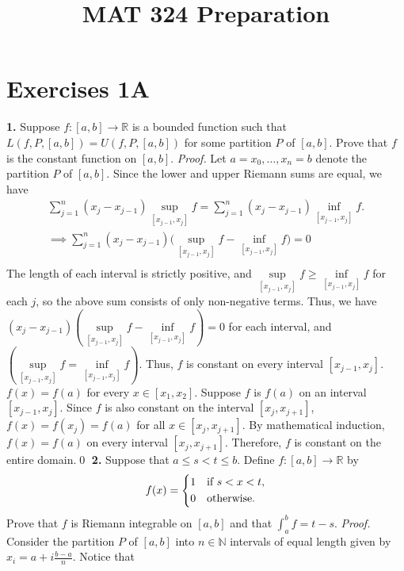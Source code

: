 \documentclass{article}
\title{MAT 324 Preparation}
\date{}
\begin{document}
\section*{Exercises 1A}
\textbf{1. } Suppose $f:[a,b]\rightarrow \mathbb{R}$ is a bounded function such that $L(f,P,[a,b])=U(f,P,[a,b])$ for some partition $P$ of $[a,b]$. Prove that $f$ is the constant function on $[a,b]$.
\newline
\textit{Proof.} Let $a=x_0,\ldots,x_n=b$ denote the partition $P$ of $[a,b]$. Since the lower and upper Riemann sums are equal, we have
\begin{align*}
    \sum_{j=1}^n(x_j-x_{j-1})\underset{[x_{j-1},x_j]}{\sup}f=\sum_{j=1}^n(x_j-x_{j-1})\underset{[x_{j-1},x_j]}{\inf}f.\\
    \implies
    \sum_{j=1}^n(x_j-x_{j-1})\Big(\underset{[x_{j-1},x_j]}{\sup}f-\underset{[x_{j-1},x_j]}{\inf}f\Big)=0\\
\end{align*}
The length of each interval is strictly positive, and $\underset{[x_{j-1},x_j]}{\sup}f\geq \underset{[x_{j-1},x_j]}{\inf}f$ for each $j$, so the above sum consists of only non-negative terms. Thus, we have $(x_j-x_{j-1})(\underset{[x_{j-1},x_j]}{\sup}f-\underset{[x_{j-1},x_j]}{\inf}f)=0$ for each interval, and $(\underset{[x_{j-1},x_j]}{\sup}f=\underset{[x_{j-1},x_j]}{\inf}f)$. Thus, $f$ is constant on every interval $[x_{j-1},x_j]$.
\\
\newline
\newline
$f(x)=f(a)$ for every $x\in[x_1,x_2]$. Suppose $f$ is $f(a)$ on an interval $[x_{j-1},x_j]$. Since $f$ is also constant on the interval $[x_j,x_{j+1}]$, $f(x)=f(x_j)=f(a)$ for all $x\in [x_j,x_{j+1}]$. By mathematical induction, $f(x)=f(a)$ on every interval $[x_j,x_{j+1}]$. Therefore, $f$ is constant on the entire domain.\qed
\newline
\newline
\textbf{2. } Suppose that $a\leq s < t \leq b$. Define $f:[a,b]\rightarrow \mathbb{R}$ by 
\begin{equation*}
    f(x)=
    \begin{cases*}
        1 &\text{if }$s<x<t$,\\
        0 &\text{otherwise.}
    \end{cases*}
\end{equation*}
Prove that $f$ is Riemann integrable on $[a,b]$ and that $\int_{a}^{b}f=t-s$. 
\newline
\textit{Proof.} Consider the partition $P$ of $[a,b]$ into $n\in\mathbb{N}$ intervals of equal length given by $x_i=a+i\frac{b-a}n$. Notice that 
\end{document}
